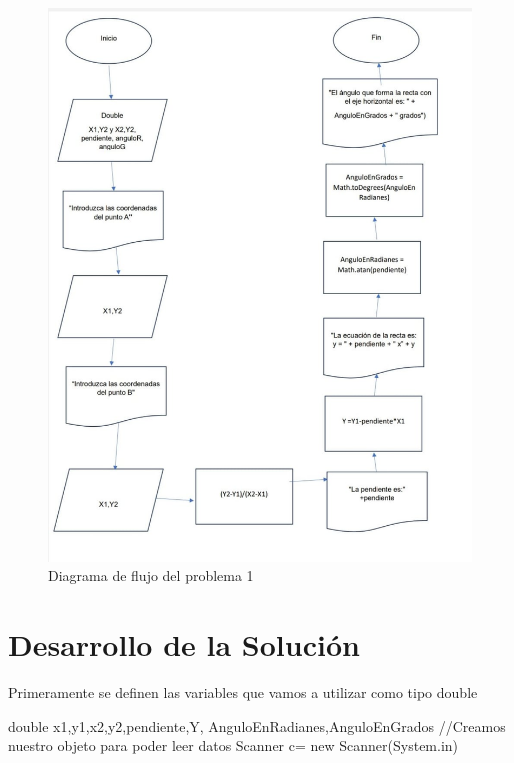 \documentclass{IEEEcsmag}
\begin{document}
\begin{figure}[h!]
    \centering
    \includegraphics[width = 8 cm]{./latex-imagenes/DiagramaFlujo1.jpg}
    \caption{Diagrama de flujo del problema 1}
    \label{fig:Diagramadeflujode2 problema2}
\end{figure}

\section*{Desarrollo de la Solución}
Primeramente se definen las variables que vamos a utilizar como tipo double
\begin{javaCode}
  double x1,y1,x2,y2,pendiente,Y,
  AnguloEnRadianes,AnguloEnGrados
//Creamos nuestro objeto para poder leer datos 
Scanner c= new Scanner(System.in)
\end{javaCode}
\end{document}
